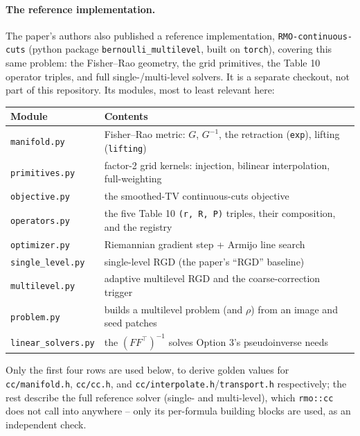 \documentclass[11pt]{article}
\begin{document}
\paragraph{The reference implementation.} The paper's authors also published a reference
implementation, \texttt{RMO-continuous-cuts} (python package \texttt{bernoulli\_multilevel},
built on \texttt{torch}), covering this same problem: the Fisher--Rao geometry, the grid
primitives, the Table 10 operator triples, and full single-/multi-level solvers. It is a
separate checkout, not part of this repository. Its modules, most to least relevant here:

\begin{center}
\begin{tabular}{@{}ll@{}}
\toprule
Module & Contents \\
\midrule
\texttt{manifold.py}       & Fisher--Rao metric: $G$, $G^{-1}$, the retraction (\texttt{exp}), lifting (\texttt{lifting}) \\
\texttt{primitives.py}     & factor-2 grid kernels: injection, bilinear interpolation, full-weighting \\
\texttt{objective.py}      & the smoothed-TV continuous-cuts objective \\
\texttt{operators.py}      & the five Table 10 \texttt{(r, R, P)} triples, their composition, and the registry \\
\texttt{optimizer.py}      & Riemannian gradient step + Armijo line search \\
\texttt{single\_level.py}  & single-level RGD (the paper's ``RGD'' baseline) \\
\texttt{multilevel.py}     & adaptive multilevel RGD and the coarse-correction trigger \\
\texttt{problem.py}        & builds a multilevel problem (and $\rho$) from an image and seed patches \\
\texttt{linear\_solvers.py}& the $(FF^\top)^{-1}$ solves Option 3's pseudoinverse needs \\
\bottomrule
\end{tabular}
\end{center}

Only the first four rows are used below, to derive golden values for \texttt{cc/manifold.h},
\texttt{cc/cc.h}, and \texttt{cc/interpolate.h}/\texttt{transport.h} respectively; the rest
describe the full reference solver (single- and multi-level), which \texttt{rmo::cc} does
not call into anywhere -- only its per-formula building blocks are used, as an independent
check.
\end{document}
